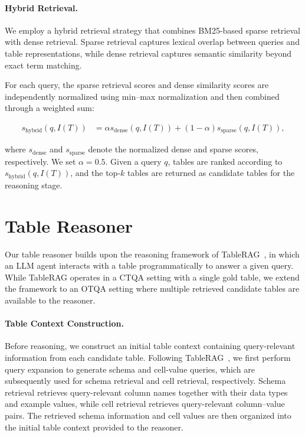 \paragraph{Hybrid Retrieval.}
We employ a hybrid retrieval strategy that combines BM25-based sparse retrieval with dense retrieval.
Sparse retrieval captures lexical overlap between queries and table representations, while dense retrieval captures semantic similarity beyond exact term matching.

For each query, the sparse retrieval scores and dense similarity scores are independently normalized using min--max normalization and then combined through a weighted sum:

\begin{align*}
s_{\mathrm{hybrid}}(q,I(T))
& = \alpha s_{\mathrm{dense}}(q,I(T))
+ (1-\alpha)s_{\mathrm{sparse}}(q,I(T)),
\end{align*}

where $s_{\mathrm{dense}}$ and $s_{\mathrm{sparse}}$ denote the normalized dense and sparse scores, respectively.
We set $\alpha=0.5$.
Given a query $q$, tables are ranked according to $s_{\mathrm{hybrid}}(q,I(T))$, and the top-$k$ tables are returned as candidate tables for the reasoning stage.

\section{Table Reasoner}
Our table reasoner builds upon the reasoning framework of TableRAG~\cite{tablerag}, in which an LLM agent interacts with a table programmatically to answer a given query.
While TableRAG operates in a CTQA setting with a single gold table, we extend the framework to an OTQA setting where multiple retrieved candidate tables are available to the reasoner.

\paragraph{Table Context Construction.}
Before reasoning, we construct an initial table context containing query-relevant information from each candidate table.
Following TableRAG~\cite{tablerag}, we first perform query expansion to generate schema and cell-value queries, which are subsequently used for schema retrieval and cell retrieval, respectively.
Schema retrieval retrieves query-relevant column names together with their data types and example values, while cell retrieval retrieves query-relevant column--value pairs.
The retrieved schema information and cell values are then organized into the initial table context provided to the reasoner.

